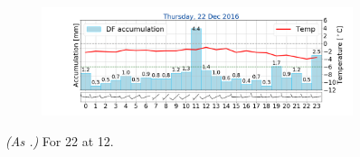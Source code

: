 \begin{figure}[ht!]
	\begin{subfigure}[b]{0.49\textwidth}
		\includegraphics[trim={4.9cm 1.cm 1.5cm 1cm},clip,
		width=\textwidth]{./fig_weathermast/T_P_U_20161222}
		\caption{} \label{fig:TPU22}
	\end{subfigure}
	\caption{\textit{(As .)} For \SI{22}{\dec} at \SI{12}{\UTC}.}\label{fig:weather:22}
\end{figure}
\newpage
